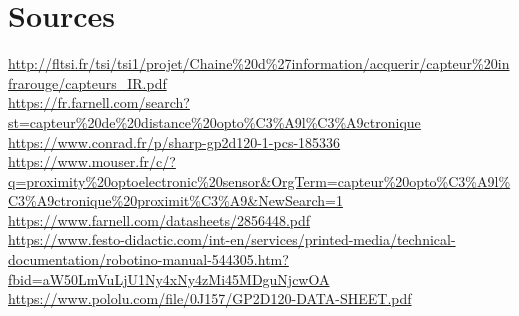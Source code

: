 \documentclass[oneside,a4paper,12pt]{article}
\begin{document}
	\newpage
	\section{Sources}
	\url{http://fltsi.fr/tsi/tsi1/projet/Chaine\%20d\%27information/acquerir/capteur\%20infrarouge/capteurs\_IR.pdf}\\
	
	\url{https://fr.farnell.com/search?st=capteur%20de%20distance%20opto%C3%A9l%C3%A9ctronique}\\
	
	\url{https://www.conrad.fr/p/sharp-gp2d120-1-pcs-185336}\\
	
	\url{https://www.mouser.fr/c/?q=proximity%20optoelectronic%20sensor&OrgTerm=capteur%20opto%C3%A9l%C3%A9ctronique%20proximit%C3%A9&NewSearch=1}\\
	
	\url{https://www.farnell.com/datasheets/2856448.pdf}\\
	
	\url{https://www.festo-didactic.com/int-en/services/printed-media/technical-documentation/robotino-manual-544305.htm?fbid=aW50LmVuLjU1Ny4xNy4zMi45MDguNjcwOA}\\
	
	\url{https://www.pololu.com/file/0J157/GP2D120-DATA-SHEET.pdf}
	
	
	
	
\end{document}
